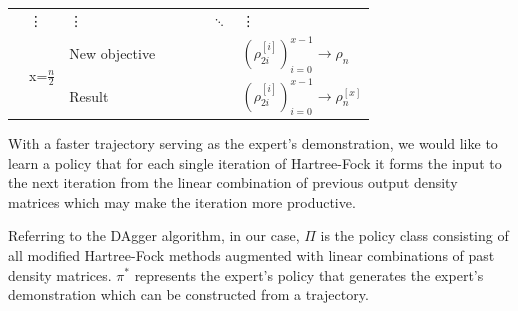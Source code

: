 \documentclass[twoside]{article}
\begin{document}
\begin{center}
\begin{table}[t]
\begin{tabular}{|l|l|l|l|l|l|l|l|}
	& \vdots      & \vdots      &                &                &                & $\ddots$ &   \vdots \\ \cline{2-8} 
	& \multirow{2}{*}{ x=$\frac{n}{2}$} & New objective         &                         &                          &                            &  & $(\rho_{2i}^{[i]})_{i=0}^{x-1} \rightarrow \rho_{n}$     \\ \cline{3-8} 
	&                & Result  &                &                &                &  & $(\rho_{2i}^{[i]})_{i=0}^{x-1}\rightarrow \rho_{n}^{[x]}$ \\ \hline
	\end{tabular}
	\end{table}
\end{center} 




% 

With a faster trajectory serving as the expert's demonstration, we would like to learn a policy that for each single iteration of Hartree-Fock it forms the input to the next iteration from the linear combination of previous output density matrices which may make the iteration more productive.   

Referring to the DAgger algorithm, in our case, $\Pi$ is the policy class consisting of all modified Hartree-Fock methods augmented with linear combinations of past density matrices. $\pi^*$ represents the expert's policy that generates the expert's demonstration which can be constructed from a trajectory. 




\end{document}
